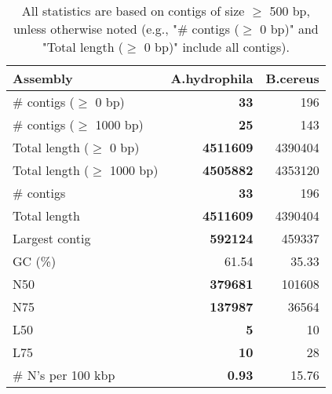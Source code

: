 \documentclass[12pt,a4paper]{article}
\begin{document}
\begin{table}[ht]
\begin{center}
\caption{All statistics are based on contigs of size $\geq$ 500 bp, unless otherwise noted (e.g., "\# contigs ($\geq$ 0 bp)" and "Total length ($\geq$ 0 bp)" include all contigs).}
\begin{tabular}{|l*{2}{|r}|}
\hline
Assembly & A.hydrophila & B.cereus \\ \hline
\# contigs ($\geq$ 0 bp) & {\bf 33} & 196 \\ \hline
\# contigs ($\geq$ 1000 bp) & {\bf 25} & 143 \\ \hline
Total length ($\geq$ 0 bp) & {\bf 4511609} & 4390404 \\ \hline
Total length ($\geq$ 1000 bp) & {\bf 4505882} & 4353120 \\ \hline
\# contigs & {\bf 33} & 196 \\ \hline
Total length & {\bf 4511609} & 4390404 \\ \hline
Largest contig & {\bf 592124} & 459337 \\ \hline
GC (\%) & 61.54 & 35.33 \\ \hline
N50 & {\bf 379681} & 101608 \\ \hline
N75 & {\bf 137987} & 36564 \\ \hline
L50 & {\bf 5} & 10 \\ \hline
L75 & {\bf 10} & 28 \\ \hline
\# N's per 100 kbp & {\bf 0.93} & 15.76 \\ \hline
\end{tabular}
\end{center}
\end{table}
\end{document}
